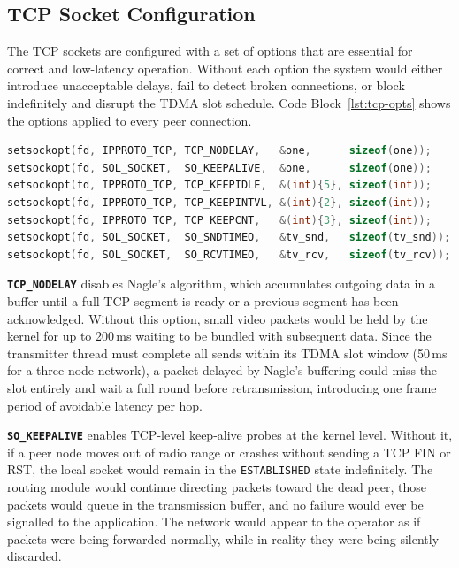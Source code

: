 \subsection{TCP Socket Configuration}
\label{subsec:tcp-socket-config}

The TCP sockets are configured with a set of options that are essential for correct and
low-latency operation. Without each option the system would either introduce unacceptable
delays, fail to detect broken connections, or block indefinitely and disrupt the TDMA slot
schedule. Code Block~\ref{lst:tcp-opts} shows the options applied to every peer connection.

\begin{lstlisting}[language=C,
    caption={TCP socket options applied to each peer connection},
    label={lst:tcp-opts}]
setsockopt(fd, IPPROTO_TCP, TCP_NODELAY,   &one,      sizeof(one));
setsockopt(fd, SOL_SOCKET,  SO_KEEPALIVE,  &one,      sizeof(one));
setsockopt(fd, IPPROTO_TCP, TCP_KEEPIDLE,  &(int){5}, sizeof(int));
setsockopt(fd, IPPROTO_TCP, TCP_KEEPINTVL, &(int){2}, sizeof(int));
setsockopt(fd, IPPROTO_TCP, TCP_KEEPCNT,   &(int){3}, sizeof(int));
setsockopt(fd, SOL_SOCKET,  SO_SNDTIMEO,   &tv_snd,   sizeof(tv_snd));
setsockopt(fd, SOL_SOCKET,  SO_RCVTIMEO,   &tv_rcv,   sizeof(tv_rcv));
\end{lstlisting}

\textbf{\texttt{TCP\_NODELAY}} disables Nagle's algorithm, which accumulates outgoing data
in a buffer until a full TCP segment is ready or a previous segment has been acknowledged.
Without this option, small video packets would be held by the kernel for up to 200\,ms
waiting to be bundled with subsequent data. Since the transmitter thread must complete all
sends within its TDMA slot window (50\,ms for a three-node network), a packet delayed by
Nagle's buffering could miss the slot entirely and wait a full round before retransmission,
introducing one frame period of avoidable latency per hop.

\textbf{\texttt{SO\_KEEPALIVE}} enables TCP-level keep-alive probes at the kernel level.
Without it, if a peer node moves out of radio range or crashes without sending a TCP FIN or
RST, the local socket would remain in the \texttt{ESTABLISHED} state indefinitely. The routing
module would continue directing packets toward the dead peer, those packets would queue in
the transmission buffer, and no failure would ever be signalled to the application. The network
would appear to the operator as if packets were being forwarded normally, while in reality they
were being silently discarded.

